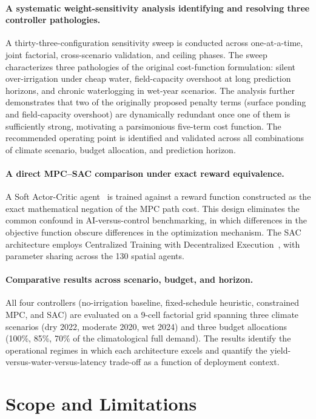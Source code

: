 \paragraph{A systematic weight-sensitivity analysis identifying and
resolving three controller pathologies.} A thirty-three-configuration
sensitivity sweep is conducted across one-at-a-time, joint factorial,
cross-scenario validation, and ceiling phases. The sweep characterizes
three pathologies of the original cost-function formulation: silent
over-irrigation under cheap water, field-capacity overshoot at long
prediction horizons, and chronic waterlogging in wet-year scenarios.
The analysis further demonstrates that two of the originally proposed
penalty terms (surface ponding and field-capacity overshoot) are
dynamically redundant once one of them is sufficiently strong,
motivating a parsimonious five-term cost function. The recommended
operating point is identified and validated across all combinations
of climate scenario, budget allocation, and prediction horizon.

\paragraph{A direct MPC--SAC comparison under exact reward equivalence.}
A Soft Actor-Critic
agent~\cite{haarnoja2018sac,haarnoja2019sac} is trained against a
reward function constructed as the exact mathematical negation of
the MPC path cost. This design eliminates the common confound in
AI-versus-control benchmarking, in which differences in the objective
function obscure differences in the optimization mechanism. The SAC
architecture employs Centralized Training with Decentralized
Execution~\cite{amato2024ctde}, with parameter sharing across the 130
spatial agents.

\paragraph{Comparative results across scenario, budget, and horizon.}
All four controllers (no-irrigation baseline, fixed-schedule
heuristic, constrained MPC, and SAC) are evaluated on a 9-cell
factorial grid spanning three climate scenarios (dry 2022, moderate
2020, wet 2024) and three budget allocations (100\%, 85\%, 70\% of
the climatological full demand). The results identify the operational
regimes in which each architecture excels and quantify the
yield-versus-water-versus-latency trade-off as a function of
deployment context.

\section{Scope and Limitations}
\label{sec:intro-scope}

